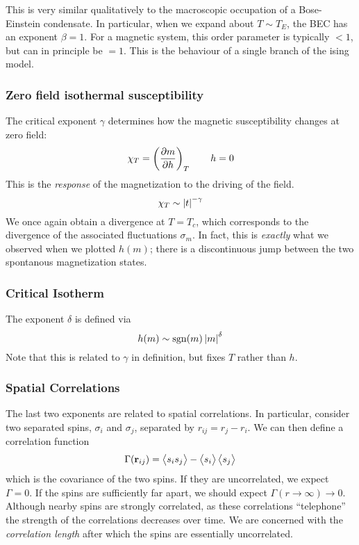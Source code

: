This is very similar qualitatively to the macroscopic occupation of a Bose-Einstein condensate. In particular, when we expand about \(T\sim T_E\), the BEC has an exponent \(\beta=1\). For a magnetic system, this order parameter is typically \(<1\), but can in principle be \(=1\). This is the behaviour of a single branch of the ising model.

\subsubsection{Zero field isothermal susceptibility}
The critical exponent \(\gamma\) determines how the magnetic susceptibility changes at zero field:
\begin{equation}
\chi_T = \left(\frac{\partial m}{\partial h}\right)_T\qquad h=0
\end{equation}
This is the \emph{response} of the magnetization to the driving of the field. 
\begin{equation}
	\chi_T \sim \left|t\right|^{-\gamma}
\end{equation}
We once again obtain a divergence at \(T=T_c\), which corresponds to the divergence of the associated fluctuations \(\sigma_m\). In fact, this is \emph{exactly} what we observed when we plotted \(h(m)\); there is a discontinuous jump between the two spontanous magnetization states.

\subsubsection{Critical Isotherm}
The exponent \(\delta\) is defined via
\begin{equation}
	h(m) \sim \operatorname{sgn}(m)\left|m\right|^\delta 
\end{equation}
Note that this is related to \(\gamma\) in definition, but fixes \(T\) rather than \(h\).

\subsubsection{Spatial Correlations}
The last two exponents are related to spatial correlations. In particular, consider two separated spins, \(\sigma_i\) and \(\sigma_j\), separated by \(r_{ij} = r_j-r_i\). We can then define a correlation function 
\begin{equation}
	\Gamma(\mathbf{r}_{ij}) = \left\langle \begin{matrix}s_is_j\end{matrix} \right\rangle-\left\langle \begin{matrix}s_i\end{matrix} \right\rangle\left\langle \begin{matrix}s_j\end{matrix} \right\rangle
\end{equation}
which is the covariance of the two spins. If they are uncorrelated, we expect \(\Gamma = 0\). If the spins are sufficiently far apart, we should expect \(\Gamma(r\to\infty)\to 0\). Although nearby spins are strongly correlated, as these correlations ``telephone'' the strength of the correlations decreases over time. We are concerned with the \emph{correlation length} after which the spins are essentially uncorrelated. 

